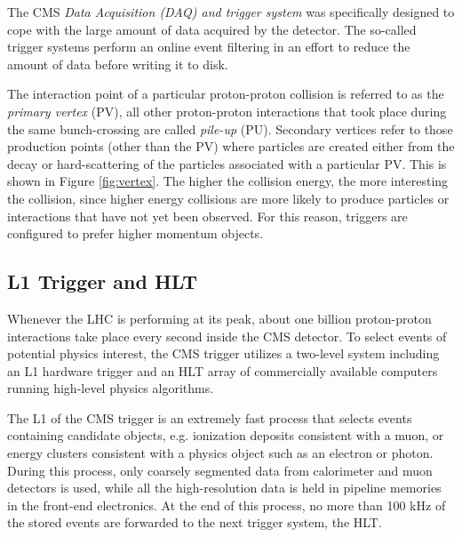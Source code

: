 The CMS \textit{Data Acquisition (DAQ) and trigger system} was specifically designed to cope with the large amount of data acquired by the detector. The so-called trigger systems perform an online event filtering  in an effort to reduce the amount of data before writing it to disk.

 The interaction point of a particular proton-proton collision is referred to as the \textit{primary vertex} (PV), all other proton-proton interactions that took place during the same bunch-crossing are called \textit{pile-up} (PU). Secondary vertices refer to those production points (other than the PV) where particles are created either from the decay or hard-scattering of the particles associated with a particular PV. This is shown in Figure \ref{fig:vertex}. The higher the collision energy, the more interesting the collision, since higher energy collisions are more likely to produce particles or interactions that have not yet been observed. For this reason, triggers are configured to prefer higher momentum objects. 

\subsection{L1 Trigger and HLT}
 Whenever the LHC is performing at its peak, about one billion proton-proton interactions take place every second inside the CMS detector. To select events of potential physics interest, the CMS trigger\cite{Khachatryan_2017} utilizes a two-level system including an L1 hardware trigger and an HLT array of commercially available computers running high-level physics algorithms.

The L1 of the CMS trigger is an extremely fast process that selects events containing candidate objects, e.g. ionization deposits consistent with a muon, or energy clusters consistent with a physics object such as an electron or photon. During this process, only coarsely segmented data from calorimeter and muon detectors is used, while all the high-resolution data is held in pipeline memories in the front-end electronics. At the end of this process, no more than 100 kHz of the stored events are forwarded to the next trigger system, the HLT.  


